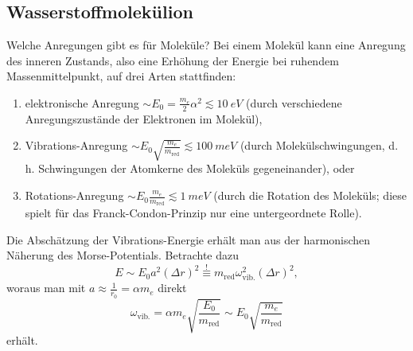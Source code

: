 


\subsection{Wasserstoffmolekülion}

\begin{fquestion}{Welche Anregungen gibt es für Moleküle?}
    Bei einem Molekül kann eine Anregung des inneren Zustands, also eine Erhöhung der Energie bei ruhendem Massenmittelpunkt, auf drei Arten stattfinden:
    \begin{enumerate}
        \item elektronische Anregung $\sim E_0 = \frac{m_e}{2}\alpha^2 \lesssim \SI{10}{eV}$ (durch verschiedene Anregungszustände der Elektronen im Molekül),
        \item Vibrations-Anregung $\sim E_0\sqrt{\frac{m_e}{m_\mathrm{red}}} \lesssim \SI{100}{meV}$ (durch Molekülschwingungen, d. h. Schwingungen der Atomkerne des Moleküls gegeneinander), oder
        \item Rotations-Anregung $\sim E_0\frac{m_e}{m_\mathrm{red}} \lesssim \SI{1}{meV}$ (durch die Rotation des Moleküls; diese spielt für das Franck-Condon-Prinzip nur eine untergeordnete Rolle).
    \end{enumerate}
    Die Abschätzung der Vibrations-Energie erhält man aus der harmonischen Näherung des Morse-Potentials.
    Betrachte dazu 
    $$E\sim E_0a^2 (\Delta r)^2 \overset{!}{\equiv} m_\mathrm{red}\omega_\mathrm{vib.}^2 (\Delta r)^2,$$
    woraus man mit $a\approx \frac{1}{r_0} = \alpha m_e$ direkt 
    $$\omega_\mathrm{vib.} = \alpha m_e \sqrt{\frac{E_0}{m_\mathrm{red}}} \sim E_0 \sqrt{\frac{m_e}{m_\mathrm{red}}}$$ 
    erhält.
\end{fquestion}


